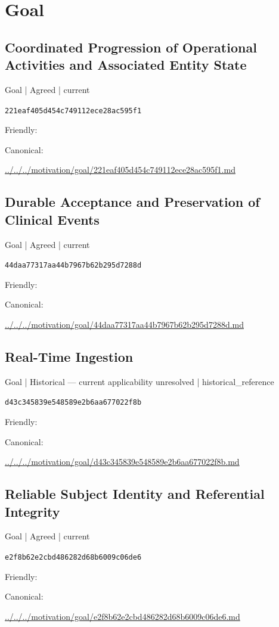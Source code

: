 \documentclass[10pt,a4paper]{article}
\begin{document}
\section*{Goal}
\subsection*{Coordinated Progression of Operational Activities and Associated Entity State}
{\small Goal | Agreed | current}\par
\texttt{221eaf405d454c749112ece28ac595f1}\par
Friendly: \par
Canonical: \par
{\footnotesize\url{../../../motivation/goal/221eaf405d454c749112ece28ac595f1.md}}\par
\subsection*{Durable Acceptance and Preservation of Clinical Events}
{\small Goal | Agreed | current}\par
\texttt{44daa77317aa44b7967b62b295d7288d}\par
Friendly: \par
Canonical: \par
{\footnotesize\url{../../../motivation/goal/44daa77317aa44b7967b62b295d7288d.md}}\par
\subsection*{Real-Time Ingestion}
{\small Goal | Historical — current applicability unresolved | historical\_reference}\par
\texttt{d43c345839e548589e2b6aa677022f8b}\par
Friendly: \par
Canonical: \par
{\footnotesize\url{../../../motivation/goal/d43c345839e548589e2b6aa677022f8b.md}}\par
\subsection*{Reliable Subject Identity and Referential Integrity}
{\small Goal | Agreed | current}\par
\texttt{e2f8b62e2cbd486282d68b6009c06de6}\par
Friendly: \par
Canonical: \par
{\footnotesize\url{../../../motivation/goal/e2f8b62e2cbd486282d68b6009c06de6.md}}\par
\end{document}
